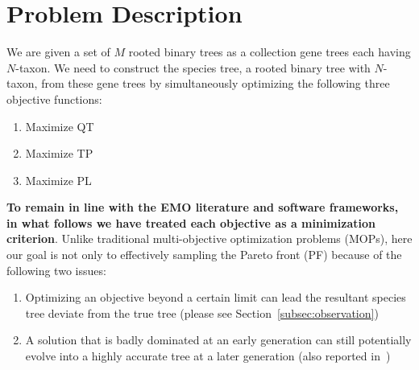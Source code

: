\section{Problem Description}
\label{sec:problem}
We are given a set of $M$ rooted binary trees as a collection gene trees each having $N$-taxon. We need to construct the species tree, a rooted binary tree with $N$-taxon, from these gene trees by simultaneously optimizing the following three objective functions:  
\begin{enumerate}[label=$F_\arabic*$)]        
	\item Maximize QT 
	\item Maximize TP
	\item Maximize PL 
\end{enumerate}
 \textbf{To remain in line with the EMO literature and software frameworks, in what follows we have treated each objective as a minimization criterion}. Unlike traditional multi-objective optimization problems (MOPs), here our goal is not only to effectively sampling the Pareto front (PF) because of the following two issues:
\begin{enumerate}[label=$I_\arabic*$]
	\item \label{item:i1} Optimizing an objective beyond a certain limit can lead the resultant species tree deviate from the true tree (please see Section~\ref{subsec:observation})
	\item \label{item:i2} A solution that is badly dominated at an early generation can still potentially evolve into a highly accurate tree at a later generation (also reported in~\cite{qu2010multi})
\end{enumerate}


